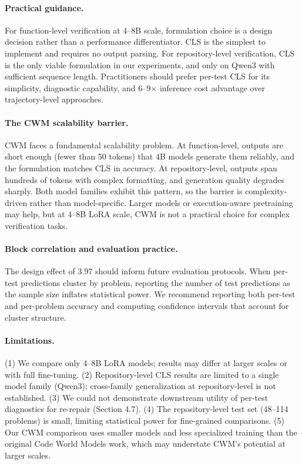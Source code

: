 \documentclass[11pt,a4paper]{article}
\begin{document}
\paragraph{Practical guidance.}
For function-level verification at 4--8B scale, formulation choice is a design decision rather than a performance differentiator. CLS is the simplest to implement and requires no output parsing. For repository-level verification, CLS is the only viable formulation in our experiments, and only on Qwen3 with sufficient sequence length. Practitioners should prefer per-test CLS for its simplicity, diagnostic capability, and 6--9$\times$ inference cost advantage over trajectory-level approaches.

\paragraph{The CWM scalability barrier.}
CWM faces a fundamental scalability problem. At function-level, outputs are short enough (fewer than 50 tokens) that 4B models generate them reliably, and the formulation matches CLS in accuracy. At repository-level, outputs span hundreds of tokens with complex formatting, and generation quality degrades sharply. Both model families exhibit this pattern, so the barrier is complexity-driven rather than model-specific. Larger models or execution-aware pretraining may help, but at 4--8B LoRA scale, CWM is not a practical choice for complex verification tasks.

\paragraph{Block correlation and evaluation practice.}
The design effect of 3.97 should inform future evaluation protocols. When per-test predictions cluster by problem, reporting the number of test predictions as the sample size inflates statistical power. We recommend reporting both per-test and per-problem accuracy and computing confidence intervals that account for cluster structure.

\paragraph{Limitations.}
(1) We compare only 4--8B LoRA models; results may differ at larger scales or with full fine-tuning. (2) Repository-level CLS results are limited to a single model family (Qwen3); cross-family generalization at repository-level is not established. (3) We could not demonstrate downstream utility of per-test diagnostics for re-repair (Section 4.7). (4) The repository-level test set (48--114 problems) is small, limiting statistical power for fine-grained comparisons. (5) Our CWM comparison uses smaller models and less specialized training than the original Code World Models work, which may understate CWM's potential at larger scales.
\end{document}
